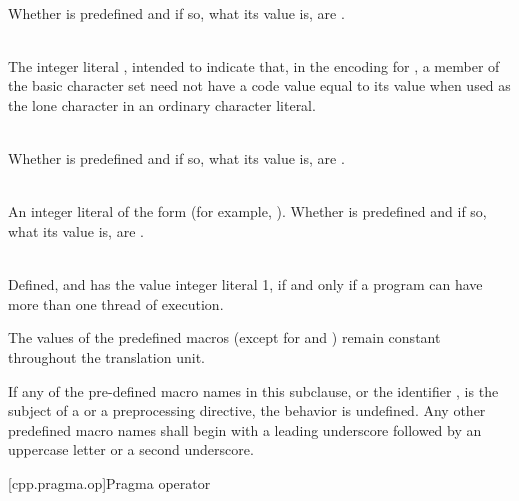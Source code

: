 \begin{description}
\item
{}%
\\
Whether  is predefined and if so, what its value is,
are .

\item
{}%
\\
The integer literal , intended to indicate that, in the encoding for
, a member of the basic character set need not have a code value equal to
its value when used as the lone character in an ordinary character literal.

\item
{}%
\\
Whether  is predefined and if so, what its value is,
are .

\item
{}%
\\
An integer literal of the form 
(for example, ).
Whether  is predefined and
if so, what its value is,
are .

\item
{}%
\\
Defined, and has the value integer literal 1, if and only if a program
can have more than one thread of execution.

\end{description}

\pnum
The values of the predefined macros
(except for
and
)
remain constant throughout the translation unit.

\pnum
If any of the pre-defined macro names in this subclause,
or the identifier
,
is the subject of a
or a
preprocessing directive,
the behavior is undefined.
Any other predefined macro names shall begin with a
leading underscore followed by an uppercase letter or a second
underscore.

[cpp.pragma.op]{Pragma operator}%
%

